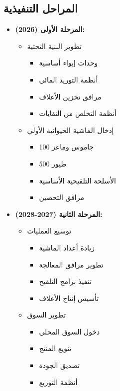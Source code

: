 \subsection{المراحل التنفيذية}
\begin{itemize}
    \item \textbf{المرحلة الأولى (2026):}
    \begin{itemize}
        \item تطوير البنية التحتية
        \begin{itemize}
            \item وحدات إيواء أساسية
            \item أنظمة التوريد المائي
            \item مرافق تخزين الأعلاف
            \item أنظمة التخلص من النفايات
        \end{itemize}
        
        \item إدخال الماشية الحيوانية الأولي
        \begin{itemize}
            \item 100 جاموس وماعز
            \item 500 طيور
            \item الأسلحة التلقيحية الأساسية
            \item مرافق التحصين
        \end{itemize}
    \end{itemize}
    
    \item \textbf{المرحلة الثانية (2027-2028):}
    \begin{itemize}
        \item توسيع العمليات
        \begin{itemize}
            \item زيادة أعداد الماشية
            \item تطوير مرافق المعالجة
            \item تنفيذ برامج التلقيح
            \item تأسيس إنتاج الأعلاف
        \end{itemize}
        
        \item تطوير السوق
        \begin{itemize}
            \item دخول السوق المحلي
            \item تنويع المنتج
            \item تصديق الجودة
            \item أنظمة التوزيع
        \end{itemize}
    \end{itemize}
    

\end{itemize}
